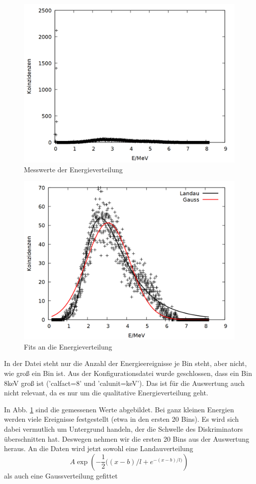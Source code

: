 \begin{figure}
\centering
\includegraphics[width=0.75\linewidth]{data/friedrich/mca_raw.png}
\caption{Messwerte der Energieverteilung}
\label{fig:mca_raw}
\end{figure}

\begin{figure}
\centering
\includegraphics[width=0.75\linewidth]{data/friedrich/mca.png}
\caption{Fits an die Energieverteilung}
\label{fig:mca}
\end{figure}

In der Datei steht nur die Anzahl der Energieereignisse je Bin steht, aber nicht, wie groß ein Bin ist. Aus der Konfigurationsdatei wurde geschlossen, dass ein Bin 8keV groß ist ('calfact=8' und 'calunit=keV'). Das ist für die Auswertung auch nicht relevant, da es nur um die qualitative Energieverteilung geht.  

In Abb. \ref{fig:mca_raw} sind die gemessenen Werte abgebildet. Bei ganz kleinen Energien werden viele Ereignisse festgestellt (etwa in den ersten 20 Bins). Es wird sich dabei vermutlich um Untergrund handeln, der die Schwelle des Diskriminators überschnitten hat. Deswegen nehmen wir die ersten 20 Bins aus der Auswertung heraus. An die Daten wird jetzt sowohl eine Landauverteilung
\[A\exp{\left(-\frac{1}{2}((x-b)/l + e^{-(x-b)/l)}\right)}\] als auch eine Gaussverteilung gefittet


